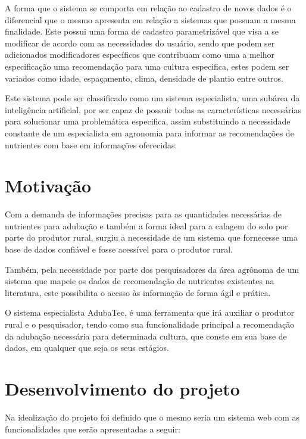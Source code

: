 \documentclass[
12pt,				%
oneside,			%
a4paper,			%
english,			%
french,				%
spanish,			%
brazil				%
]{abntex2}
\begin{document}
A forma que o sistema se comporta em relação ao cadastro de novos dados é o diferencial que o mesmo apresenta em relação a sistemas que possuam a mesma finalidade. Este possui uma forma de cadastro parametrizável que visa a se modificar de acordo com as necessidades do usuário, sendo que podem ser adicionados modificadores específicos que contribuam como uma a melhor especificação uma recomendação para uma cultura especifica, estes podem
ser variados como idade, espaçamento, clima, densidade de plantio entre outros.

Este sistema pode ser classificado como um sistema especialista, uma subárea da inteligência artificial, por ser capaz de possuir todas as características necessárias para solucionar uma problemática especifica, assim substituindo a necessidade constante de um especialista em agronomia para informar as recomendações de nutrientes com base em informações oferecidas.


\section{Motivação}


Com a demanda de informações precisas para as quantidades necessárias de
nutrientes para adubação e também a forma ideal para a calagem do solo por parte do produtor rural, surgiu a necessidade de um sistema que fornecesse uma base de dados confiável e fosse acessível para o produtor rural.

Também, pela necessidade por parte dos pesquisadores da área agrônoma de um sistema
que mapeie os dados de recomendação de nutrientes existentes na literatura, este possibilita o acesso às informação de forma ágil e prática.

O sistema especialista AdubaTec, é uma ferramenta que irá auxiliar o produtor rural e o pesquisador, tendo como sua funcionalidade principal a recomendação da adubação necessária para determinada cultura, que conste em sua base de dados, em qualquer que seja os seus estágios.

\section{Desenvolvimento do projeto}

Na idealização do projeto foi definido que o mesmo seria um sistema web com as funcionalidades que serão apresentadas a seguir:
\end{document}
